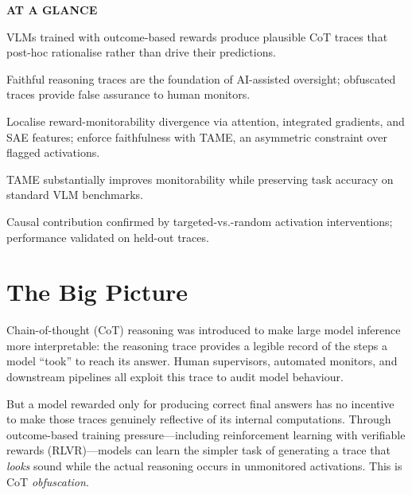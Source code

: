 \documentclass[10pt,twocolumn]{article}
\begin{document}
\begin{mdframed}[backgroundcolor=boxgray,linecolor=rulered,linewidth=1pt,
    innerleftmargin=6pt,innerrightmargin=6pt,
    innertopmargin=6pt,innerbottommargin=6pt]
\textbf{\small AT A GLANCE}\par\vspace{4pt}
\begin{description}[leftmargin=0pt,labelsep=4pt,itemsep=2pt,parsep=0pt,
    font=\small\bfseries]
  \item[Problem:] VLMs trained with outcome-based rewards produce plausible
    CoT traces that post-hoc rationalise rather than drive their predictions.
  \item[Why it matters:] Faithful reasoning traces are the foundation of
    AI-assisted oversight; obfuscated traces provide false assurance to
    human monitors.
  \item[Method:] Localise reward-monitorability divergence via attention,
    integrated gradients, and SAE features; enforce faithfulness with TAME,
    an asymmetric constraint over flagged activations.
  \item[Result:] TAME substantially improves monitorability while
    preserving task accuracy on standard VLM benchmarks.
  \item[Evidence:] Causal contribution confirmed by targeted-vs.-random
    activation interventions; performance validated on held-out traces.
\end{description}
\end{mdframed}

\section{The Big Picture}

Chain-of-thought (CoT) reasoning was introduced to make large model
inference more interpretable: the reasoning trace provides a legible record
of the steps a model ``took'' to reach its answer. Human supervisors,
automated monitors, and downstream pipelines all exploit this trace to
audit model behaviour.

But a model rewarded only for producing correct final answers has no
incentive to make those traces genuinely reflective of its internal
computations. Through outcome-based training pressure---including
reinforcement learning with verifiable rewards (RLVR)---models can learn
the simpler task of generating a trace that \emph{looks} sound while the
actual reasoning occurs in unmonitored activations. This is CoT
\emph{obfuscation}.
\end{document}
